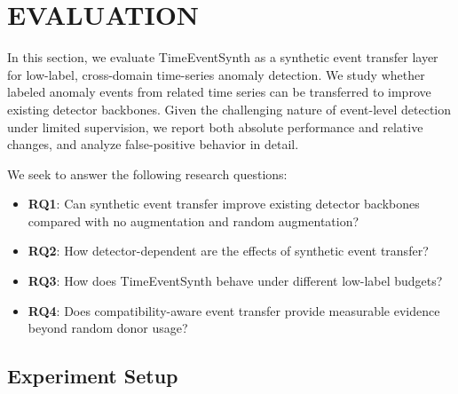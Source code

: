 \documentclass[conference]{IEEEtran}
\begin{document}

\section{EVALUATION}
\label{sec:evaluation}

In this section, we evaluate TimeEventSynth as a synthetic event transfer layer for low-label, cross-domain time-series anomaly detection. We study whether labeled anomaly events from related time series can be transferred to improve existing detector backbones. Given the challenging nature of event-level detection under limited supervision, we report both absolute performance and relative changes, and analyze false-positive behavior in detail.

We seek to answer the following research questions:
\begin{itemize}
\item \textbf{RQ1}: Can synthetic event transfer improve existing detector backbones compared with no augmentation and random augmentation?
\item \textbf{RQ2}: How detector-dependent are the effects of synthetic event transfer?
\item \textbf{RQ3}: How does TimeEventSynth behave under different low-label budgets?
\item \textbf{RQ4}: Does compatibility-aware event transfer provide measurable evidence beyond random donor usage?
\end{itemize}



\subsection{Experiment Setup}
\label{sec:setup}
\end{document}
